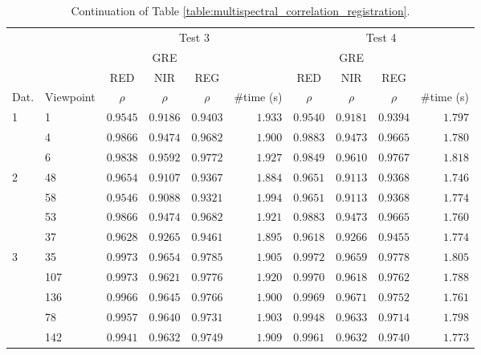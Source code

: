 \renewcommand{\arraystretch}{1.2}
\begin{table}
    \small
    \captionsetup{singlelinecheck=off}
    \caption{Continuation of Table \ref{table:multispectral_correlation_registration}.}
    \begin{tabular}{ll|cccr|cccr}
        \toprule
        \multicolumn{2}{c}{} & \multicolumn{4}{c}{Test 3} & \multicolumn{4}{c}{Test 4}\\
        \cmidrule{1-10}
        & & \multicolumn{3}{c}{GRE} & & \multicolumn{3}{c}{GRE} & \\
        & & RED & NIR & REG & & RED & NIR & REG\\
        Dat. & Viewpoint & $\rho$ & $\rho$ & $\rho$ & \#time (\si{\second}) & $\rho$ & $\rho$ & $\rho$ & \#time (\si{\second}) \\
        \cmidrule{1-10}
        \multirow{3}{*}{1} & 1 & $0.9545$ & $0.9186$ & $0.9403$ & $1.933$ & $0.9540$ & $0.9181$ & $0.9394$ & $1.797$\\
        & 4 & $0.9866$ & $0.9474$ & $0.9682$ & $1.900$ & $0.9883$ & $0.9473$ & $0.9665$ & $1.780$\\
        & 6 & $0.9838$ & $0.9592$ & $0.9772$ & $1.927$ & $0.9849$ & $0.9610$ & $0.9767$ & $1.818$\\
        \cmidrule{1-10}
        \multirow{4}{*}{2} & 48 & $0.9654$ & $0.9107$ & $0.9367$ & $1.884$ & $0.9651$ & $0.9113$ & $0.9368$ & $1.746$\\
        & 58 & $0.9546$ & $0.9088$ & $0.9321$ & $1.994$ & $0.9651$ & $0.9113$ & $0.9368$ & $1.774$\\
        & 53 & $0.9866$ & $0.9474$ & $0.9682$ & $1.921$ & $0.9883$ & $0.9473$ & $0.9665$ & $1.760$\\
        & 37 & $0.9628$ & $0.9265$ & $0.9461$ & $1.895$ & $0.9618$ & $0.9266$ & $0.9455$ & $1.774$\\
        \cmidrule{1-10}
        \multirow{8}{*}{3} & 35 & $0.9973$ & $0.9654$ & $0.9785$ & $1.905$ & $0.9972$ & $0.9659$ & $0.9778$ & $1.805$\\
        & 107 & $0.9973$ & $0.9621$ & $0.9776$ & $1.920$ & $0.9970$ & $0.9618$ & $0.9762$ & $1.788$\\
        & 136 & $0.9966$ & $0.9645$ & $0.9766$ & $1.900$ & $0.9969$ & $0.9671$ & $0.9752$ & $1.761$\\
        & 78 & $0.9957$ & $0.9640$ & $0.9731$ & $1.903$ & $0.9948$ & $0.9633$ & $0.9714$ & $1.798$\\
        & 142 & $0.9941$ & $0.9632$ & $0.9749$ & $1.909$ & $0.9961$ & $0.9632$ & $0.9740$ & $1.773$\\

\end{tabular}
\end{table}
